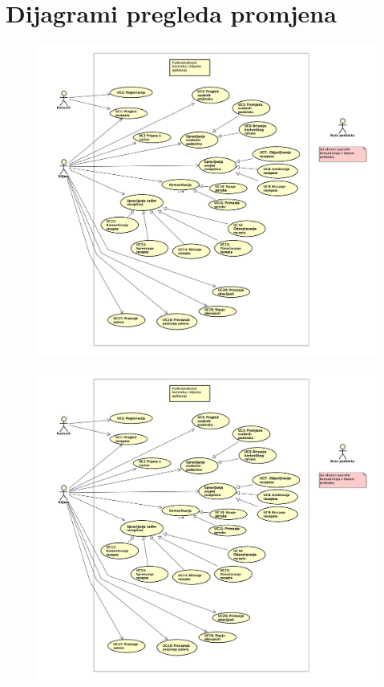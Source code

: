 		\section*{Dijagrami pregleda promjena}
		\begin{figure}[H]
			\includegraphics[scale=0.1]{dijagrami/Korisnik_klijent.png} 
			\centering
			\caption{}
			\label{fig:all}
		\end{figure}
		\begin{figure}[H]
			\includegraphics[scale=0.1]{dijagrami/Korisnik_klijent.png} 
			\centering
			\caption{}
			\label{fig:id1}
		\end{figure}
